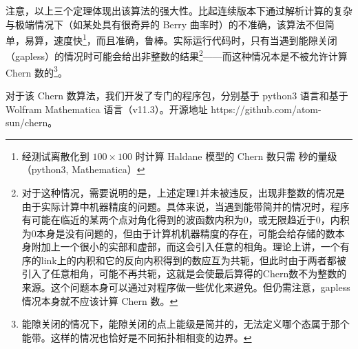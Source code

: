 注意，以上三个定理体现出该算法的强大性。比起连续版本下通过解析计算的复杂与极端情况下（如某处具有很奇异的 Berry 曲率时）的不准确，该算法不但简单，易算，速度快\footnote{经测试离散化到 $100\times100$ 时计算 Haldane 模型的 Chern 数只需 秒的量级（python3, Mathematica）}，而且准确，鲁棒。实际运行代码时，只有当遇到能隙关闭（gapless）的情况时可能会给出非整数的结果\footnote{对于这种情况，需要说明的是，上述定理1并未被违反，出现非整数的情况是由于实际计算中机器精度的问题。具体来说，当遇到能带简并的情况时，程序有可能在临近的某两个点对角化得到的波函数内积为0，或无限趋近于0，内积为0本身是没有问题的，但由于计算机机器精度的存在，可能会给存储的数本身附加上一个很小的实部和虚部，而这会引入任意的相角。理论上讲，一个有序的link上的内积和它的反向内积得到的数应互为共轭，但此时由于两者都被引入了任意相角，可能不再共轭，这就是会使最后算得的Chern数不为整数的来源。这个问题本身可以通过对程序做一些优化来避免。但仍需注意，gapless 情况本身就不应该计算 Chern 数。}——而这种情况本是不被允许计算 Chern 数的\footnote{能隙关闭的情况下，能隙关闭的点上能级是简并的，无法定义哪个态属于那个能带\cite{topobook}。这样的情况也恰好是不同拓扑相相变的边界。}。


对于该 Chern 数算法，我们开发了专门的程序包，分别基于 python3 语言和基于 Wolfram Mathematica 语言（v11.3）。开源地址\cite{repo-chern} https://github.com/atom-sun/chern。
